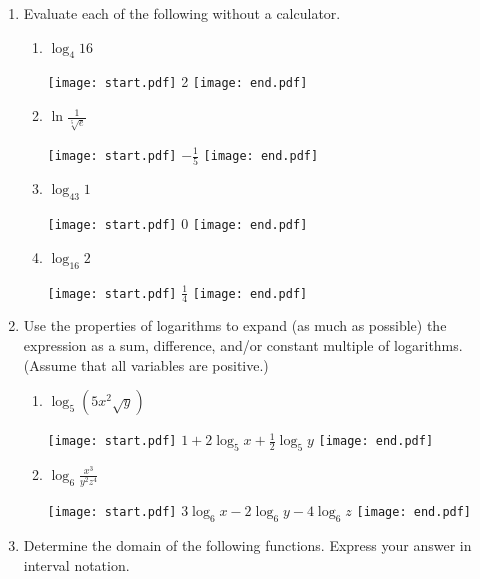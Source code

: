 \documentclass[12pt]{article}
\begin{document}
\begin{enumerate}

\item Evaluate each of the following without a calculator.

\begin{enumerate}

\item $\displaystyle \log_{4}{16}$

\texttt{[image: start.pdf]}
{2}
\texttt{[image: end.pdf]}


\item $\displaystyle \ln{\frac{1}{\sqrt[5]{e}}}$

\texttt{[image: start.pdf]}
{$\displaystyle -\frac{1}{5}$}
\texttt{[image: end.pdf]}


\item $\displaystyle \log_{43}{1}$

\texttt{[image: start.pdf]}
{0}
\texttt{[image: end.pdf]}


\item $\displaystyle \log_{16}{2}$

\texttt{[image: start.pdf]}
{$\displaystyle \frac{1}{4}$}
\texttt{[image: end.pdf]}


\end{enumerate}

\item Use the properties of logarithms to expand (as much as possible) the expression as a sum, difference, and/or constant multiple of logarithms.  (Assume that all variables are positive.)

\begin{enumerate}

\item $\displaystyle \log_{5}{(5x^{2}\sqrt{y})}$

\texttt{[image: start.pdf]}
{$\displaystyle 1+2\log_{5}{x}+\frac{1}{2}\log_{5}{y}$}
\texttt{[image: end.pdf]}


\item $\displaystyle \log_{6}{\frac{x^3}{y^2z^4}}$

\texttt{[image: start.pdf]}
{$\displaystyle 3\log_{6}{x}-2\log_{6}{y}-4\log_{6}{z}$}
\texttt{[image: end.pdf]}


\end{enumerate}

\item Determine the domain of the following functions.  Express your answer in interval notation.


\end{enumerate}
\end{document}
